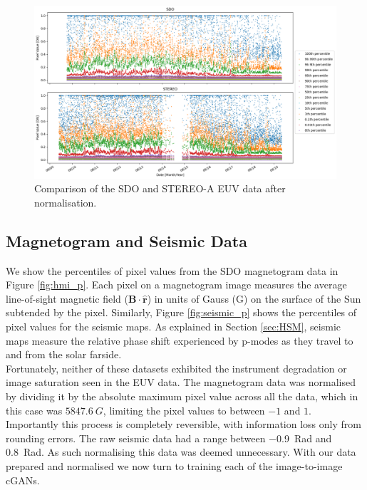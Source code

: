 \documentclass[11pt,a4paper,onecolumn]{report}
\begin{document}
\begin{figure}[t]
  \centering
  \includegraphics[width=\linewidth]{AIA_STEREO_normalised.png}
  \caption{Comparison of the SDO and STEREO-A EUV data after normalisation.}
  \label{fig:sdo_stereo_comparison}
\end{figure}



\subsection{Magnetogram and Seismic Data}
We show the percentiles of pixel values from the SDO magnetogram data in Figure
\ref{fig:hmi_p}. Each pixel on a magnetogram image measures the average
line-of-sight magnetic field ($\mathbf{B}\cdot\mathbf{\hat{r}}$) in units of
Gauss (G) on the surface of the Sun subtended by the pixel. Similarly, Figure
\ref{fig:seismic_p} shows the percentiles of pixel values for the seismic maps.
As explained in Section \ref{sec:HSM}, seismic maps measure the relative phase
shift experienced by p-modes as they travel to and from the solar farside. \\

Fortunately, neither of these datasets exhibited the instrument degradation or
image saturation seen in the EUV data. The magnetogram data was normalised by
dividing it by the absolute maximum pixel value across all the data, which in
this case was $\SI[]{5847.6}[]{G}$, limiting the pixel values to between $-1$
and $1$. Importantly this process is completely reversible, with information
loss only from rounding errors. The raw seismic data had a range between
\SI{-0.9}{Rad} and \SI{0.8}{Rad}. As such normalising this data was deemed
unnecessary. %
With our data prepared and normalised we now turn to training each of the
image-to-image cGANs.
\end{document}
